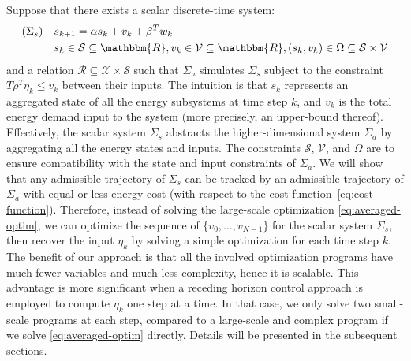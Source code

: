 Suppose that there exists a scalar discrete-time system:
\begin{align*}
(\Sigma_s) \quad
& s_{k + 1} = \alpha s_k + v_k + \beta^T w_{k} \\
& s_k \in \SSet \subseteq \mathbbm{R},
  v_k \in \VSet \subseteq \mathbbm{R},
  (s_k, v_k) \in \Omega \subseteq \SSet \times \VSet
\end{align*}
and a relation $\mathcal{R} \subseteq \mathcal{X} \times \mathcal{S}$ such
that $\Sigma_a$ simulates $\Sigma_s$ subject to the constraint $T \rho^{T} \eta_k
\leqslant v_k$ between their inputs. The intuition is that $s_k$ represents an
aggregated state of all the energy subsystems at time step $k$, and $v_k$ is
the total energy demand input to the system (more precisely, an upper-bound
thereof). Effectively, the scalar system $\Sigma_s$ abstracts the
higher-dimensional system $\Sigma_a$ by aggregating all the energy states and
inputs. The constraints $\mathcal{S}$, $\mathcal{V}$, and $\Omega$ are to
ensure compatibility with the state and input constraints of $\Sigma_a$. We
will show that any admissible trajectory of $\Sigma_s$ can be tracked by an
admissible trajectory of $\Sigma_a$ with equal or less energy cost (with
respect to the cost function~\eqref{eq:cost-function}). Therefore, instead
of solving the large-scale optimization \eqref{eq:averaged-optim}, we can
optimize the sequence of $\{ v_0, \ldots, v_{N - 1} \}$ for the scalar system
$\Sigma_s$, then recover the input $\eta_k$ by solving a simple optimization for
each time step $k$.
The benefit of our approach is that all the involved optimization
programs have much fewer variables and much less complexity, hence it is scalable.
This advantage is more significant when a receding horizon control approach is employed to
compute $\eta_k$ one step at a time.
In that case, we only solve two small-scale programs at each step, compared to a large-scale and  complex program if we solve \eqref{eq:averaged-optim} directly.
Details will be presented in the subsequent sections.

